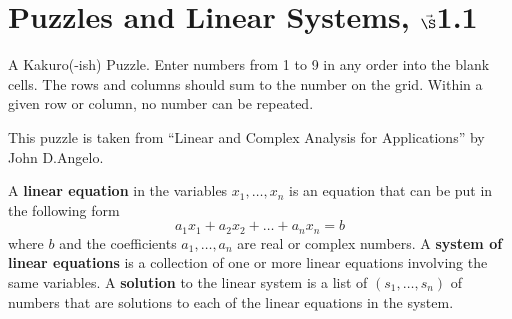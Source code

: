 


%


\section{{Puzzles and Linear Systems, $ \vec \S$1.1}}%

% 

%

\begin{enumerate}
  \Problem A Kakuro(-ish) Puzzle. Enter numbers from 1 to 9 in any order into the blank cells. The rows and columns should sum to the number on the grid. Within a given row or column, no number can be repeated.
  
  \begin{center}
  	\begin{kakuro}
\end{kakuro}
  
  \end{center}
This puzzle is taken from ``Linear and Complex Analysis for Applications'' by John D.Angelo.


\newpage

\begin{defn}
A {\bf linear equation} in the variables $x_1, \dots, x_n$ is an equation that can be put in the following form
\begin{equation*}
a_1 x_1 +a_2 x_2 +\dots + a_n x_n =b
\end{equation*}
where $b$ and the coefficients $a_1,\dots, a_n$ are real or complex numbers. A {\bf system of linear equations} is a collection of one or more linear equations involving the same variables. A {\bf solution} to the linear system is a list of $(s_1, \dots, s_n)$ of numbers that are solutions to each of the linear equations in the system. 
\end{defn}


\end{enumerate}

